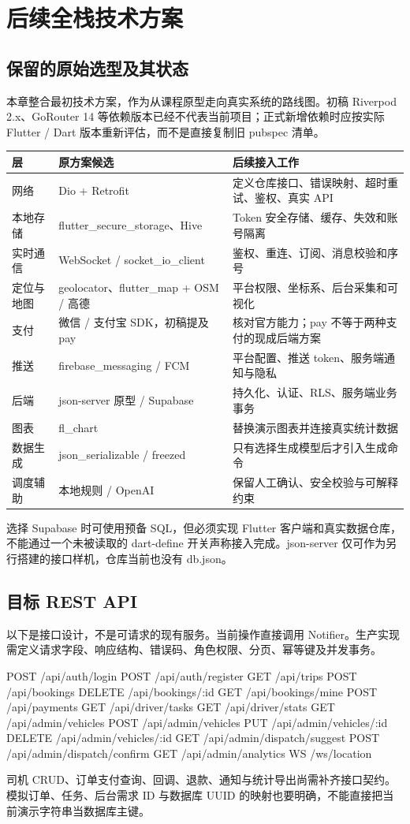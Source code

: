 \documentclass[UTF8,fontset=fandol,zihao=-4,oneside]{ctexrep}
\begin{document}
\chapter{后续全栈技术方案}
\section{保留的原始选型及其状态}
本章整合最初技术方案，作为从课程原型走向真实系统的路线图。初稿 Riverpod 2.x、GoRouter 14 等依赖版本已经不代表当前项目；正式新增依赖时应按实际 Flutter / Dart 版本重新评估，而不是直接复制旧 pubspec 清单。
\begin{longtable}{p{3cm}p{5.2cm}p{6.5cm}}
\toprule 层 & 原方案候选 & 后续接入工作 \\ \midrule
网络 & Dio + Retrofit & 定义仓库接口、错误映射、超时重试、鉴权、真实 API \\
本地存储 & flutter\_secure\_storage、Hive & Token 安全存储、缓存、失效和账号隔离 \\
实时通信 & WebSocket / socket\_io\_client & 鉴权、重连、订阅、消息校验和序号 \\
定位与地图 & geolocator、flutter\_map + OSM / 高德 & 平台权限、坐标系、后台采集和可视化 \\
支付 & 微信 / 支付宝 SDK，初稿提及 pay & 核对官方能力；pay 不等于两种支付的现成后端方案 \\
推送 & firebase\_messaging / FCM & 平台配置、推送 token、服务端通知与隐私 \\
后端 & json-server 原型 / Supabase & 持久化、认证、RLS、服务端业务事务 \\
图表 & fl\_chart & 替换演示图表并连接真实统计数据 \\
数据生成 & json\_serializable / freezed & 只有选择生成模型后才引入生成命令 \\
调度辅助 & 本地规则 / OpenAI & 保留人工确认、安全校验与可解释约束 \\
\bottomrule
\end{longtable}
选择 Supabase 时可使用预备 SQL，但必须实现 Flutter 客户端和真实数据仓库，不能通过一个未被读取的 dart-define 开关声称接入完成。json-server 仅可作为另行搭建的接口样机，仓库当前也没有 db.json。

\section{目标 REST API}
以下是接口设计，不是可请求的现有服务。当前操作直接调用 Notifier。生产实现需定义请求字段、响应结构、错误码、角色权限、分页、幂等键及并发事务。
\begin{code}
POST   /api/auth/login
POST   /api/auth/register
GET    /api/trips
POST   /api/bookings
DELETE /api/bookings/:id
GET    /api/bookings/mine
POST   /api/payments
GET    /api/driver/tasks
GET    /api/driver/stats
GET    /api/admin/vehicles
POST   /api/admin/vehicles
PUT    /api/admin/vehicles/:id
DELETE /api/admin/vehicles/:id
GET    /api/admin/dispatch/suggest
POST   /api/admin/dispatch/confirm
GET    /api/admin/analytics
WS     /ws/location
\end{code}
司机 CRUD、订单支付查询、回调、退款、通知与统计导出尚需补齐接口契约。模拟订单、任务、后台需求 ID 与数据库 UUID 的映射也要明确，不能直接把当前演示字符串当数据库主键。
\end{document}
